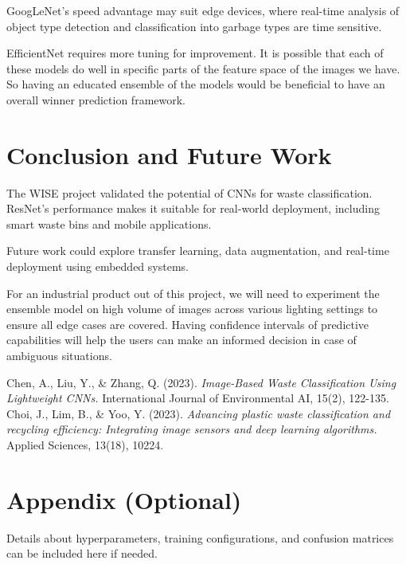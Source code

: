 \documentclass[11pt,twocolumn]{article}
\begin{document}
GoogLeNet’s speed advantage may suit edge devices, where real-time analysis of object type detection and classification into garbage types are time sensitive.

EfficientNet requires more tuning for improvement. It is possible that each of these models do well in specific parts of the feature space of the images we have. So having an educated ensemble of the models would be beneficial to have an overall winner prediction framework. 

\section{Conclusion and Future Work}
\label{sec:conclusion}
The WISE project validated the potential of CNNs for waste classification. ResNet’s performance makes it suitable for real-world deployment, including smart waste bins and mobile applications. 

Future work could explore transfer learning, data augmentation, and real-time deployment using embedded systems.

For an industrial product out of this project, we will need to experiment the ensemble model on high volume of images across various lighting settings to ensure all edge cases are covered. Having confidence intervals of predictive capabilities will help the users can make an informed decision in case of ambiguous situations.



%
\begin{thebibliography}{99}
Chen, A., Liu, Y., \& Zhang, Q. (2023).
\textit{Image-Based Waste Classification Using Lightweight CNNs.}
International Journal of Environmental AI, 15(2), 122-135.
Choi, J., Lim, B., \& Yoo, Y. (2023). 
\textit{Advancing plastic waste classification and recycling efficiency: Integrating image sensors and deep learning algorithms.}
Applied Sciences, 13(18), 10224.
\end{thebibliography}

\appendix
\section{Appendix (Optional)}
Details about hyperparameters, training configurations, and confusion matrices can be included here if needed.
\end{document}
